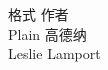 \documentclass[nofonts]{ctexart}
\begin{document}
\begin{tabbing}
        格式\hspace{3em} \= 作者 \\
        Plain \Tex  \> 高德纳 \\
        \LaTex      \> Leslie Lamport        
\end{tabbing}
\end{document}
